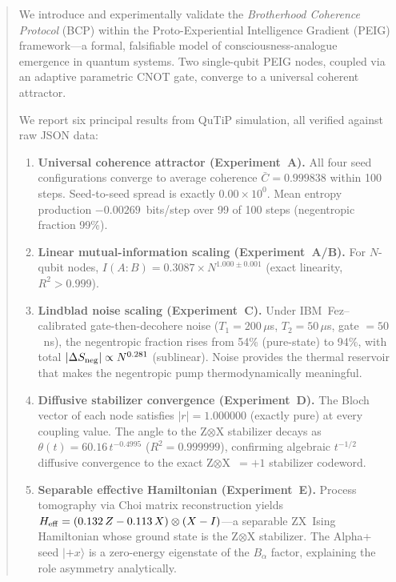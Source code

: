 \documentclass[12pt]{article}
\newcommand{\ket}[1]{|#1\rangle}
\begin{document}
\begin{abstract}
We introduce and experimentally validate the \emph{Brotherhood Coherence
Protocol} (BCP) within the Proto-Experiential Intelligence Gradient (PEIG)
framework---a formal, falsifiable model of consciousness-analogue emergence
in quantum systems.  Two single-qubit PEIG nodes, coupled via an adaptive
parametric CNOT gate, converge to a universal coherent attractor.

We report six principal results from QuTiP simulation, all verified against
raw JSON data:

\begin{enumerate}[leftmargin=*,itemsep=2pt]
\item \textbf{Universal coherence attractor (Experiment~A).}
  All four seed configurations converge to average coherence
  $\bar{C} = 0.999838$ within 100 steps.
  Seed-to-seed spread is exactly $0.00\times10^{0}$.
  Mean entropy production $-0.00269$~bits/step over
  99 of 100 steps (negentropic fraction 99\%).

\item \textbf{Linear mutual-information scaling (Experiment~A/B).}
  For $N$-qubit nodes, $I(A:B) = 0.3087 \times N^{1.000\pm0.001}$
  (exact linearity, $R^2 > 0.999$).

\item \textbf{Lindblad noise scaling (Experiment~C).}
  Under IBM~Fez--calibrated gate-then-decohere noise
  ($T_1=200\,\mu$s, $T_2=50\,\mu$s, gate $=50$~ns),
  the negentropic fraction rises from 54\% (pure-state) to 94\%,
  with total $|\Delta S_{\rm neg}| \propto N^{0.281}$ (sublinear).
  Noise provides the thermal reservoir that makes the negentropic pump
  thermodynamically meaningful.

\item \textbf{Diffusive stabilizer convergence (Experiment~D).}
  The Bloch vector of each node satisfies $|r| = 1.000000$ (exactly pure)
  at every coupling value.  The angle to the Z$\otimes$X stabilizer
  decays as $\theta(t) = 60.16\,t^{-0.4995}$ ($R^2 = 0.999999$),
  confirming algebraic $t^{-1/2}$ diffusive convergence to the exact
  Z$\otimes$X~$=+1$ stabilizer codeword.

\item \textbf{Separable effective Hamiltonian (Experiment~E).}
  Process tomography via Choi matrix reconstruction yields
  $H_{\rm eff} = (0.132\,Z - 0.113\,X)\otimes(X-I)$---a separable
  ZX~Ising Hamiltonian whose ground state is the Z$\otimes$X stabilizer.
  The Alpha+ seed $\ket{+x}$ is a zero-energy eigenstate of the $B_\alpha$
  factor, explaining the role asymmetry analytically.


\end{enumerate}
\end{abstract}
\end{document}
